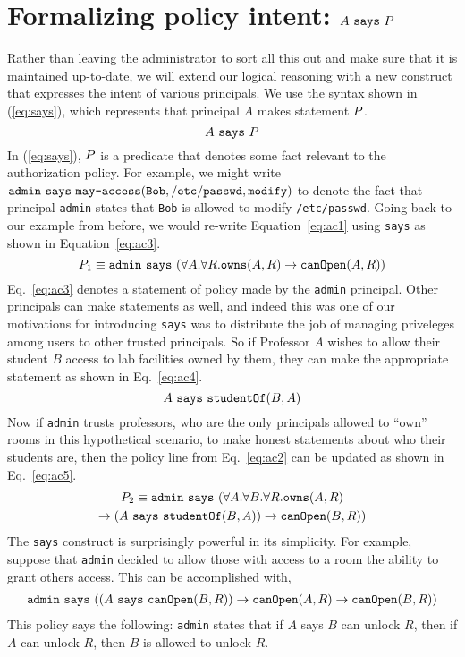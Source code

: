 \documentclass[11pt,twoside]{scrartcl}
\begin{document}
\section{Formalizing policy intent: $A~\texttt{\upshape says}~P$}

Rather than leaving the administrator to sort all this out and make sure that it is maintained up-to-date, we will extend our logical reasoning with a new construct that expresses the intent of various principals. We use the syntax shown in (\ref{eq:says}), which represents that principal $A$ makes statement $P$.
\begin{equation}
\label{eq:says}
\says{A}{\ausfml}
\end{equation}
In (\ref{eq:says}), $P$ is a predicate that denotes some fact relevant to the authorization policy. For example, we might write $\mathtt{admin}~\texttt{\upshape says}~\texttt{\upshape may-access}(\mathtt{Bob},\mathtt{/etc/passwd},\mathtt{modify})$ to denote the fact that principal \verb'admin' states that \verb'Bob' is allowed to modify \verb'/etc/passwd'. Going back to our example from before, we would re-write Equation~\ref{eq:ac1} using \verb'says' as shown in Equation~\ref{eq:ac3}.
\begin{equation}
\label{eq:ac3}
P_1 \equiv \says{\mathtt{admin}}{(\forall A.\forall R. \ownsr(A,R) \limply \canopen(A,R))}
\end{equation}
Eq.~\ref{eq:ac3} denotes a statement of policy made by the \verb'admin' principal. Other principals can make statements as well, and indeed this was one of our motivations for introducing \verb'says' was to distribute the job of managing priveleges among users to other trusted principals. So if Professor $A$ wishes to allow their student $B$ access to lab facilities owned by them, they can make the appropriate statement as shown in Eq.~\ref{eq:ac4}.
\begin{equation}
\label{eq:ac4}
\says{A}{\studof(B,A)}
\end{equation}
Now if \verb'admin' trusts professors, who are the only principals allowed to ``own'' rooms in this hypothetical scenario, to make honest statements about who their students are, then the policy line from Eq.~\ref{eq:ac2} can be updated as shown in Eq.~\ref{eq:ac5}.
\begin{multline}
\label{eq:ac5}
P_2 \equiv \says{\mathtt{admin}}{(\forall A.\forall B.\forall R. \ownsr(A,R) \\ \limply (\says{A}{\studof(B,A)}) \limply \canopen(B,R))}
\end{multline}
The \verb'says' construct is surprisingly powerful in its simplicity. For example, suppose that \verb'admin' decided to allow those with access to a room the ability to grant others access. This can be accomplished with,
\begin{multline}
\mathtt{admin}~\texttt{\upshape says}~((A~\texttt{\upshape says}~\texttt{\upshape canOpen}(B,R)) \rightarrow \texttt{\upshape canOpen}(A,R) \rightarrow \texttt{\upshape canOpen}(B,R))
\end{multline}
This policy says the following: \verb'admin' states that if $A$ says $B$ can unlock $R$, then if $A$ can unlock $R$, then $B$ is allowed to unlock $R$.
\end{document}
